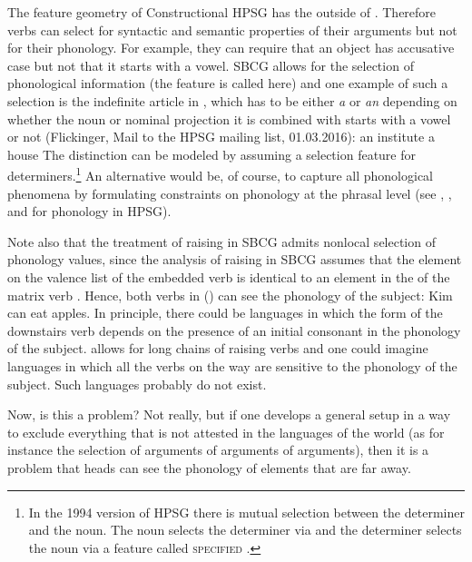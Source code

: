 \documentclass[output=paper,biblatex,babelshorthands,newtxmath,draftmode,colorlinks,citecolor=brown]{langscibook}
\begin{document}
The feature geometry of Constructional HPSG has the \phonv outside of \synsem. Therefore verbs can
select for syntactic and semantic properties of their arguments but not for their phonology. For
example, they can require that an object has accusative case but not that it starts with a
vowel. SBCG allows for the selection of phonological information (the feature is called \form here)
and one example of such a selection is the indefinite article in , which has to be either \emph{a} or
\emph{an} depending on whether the noun or nominal projection it is combined with starts with a
vowel or not (Flickinger, Mail to the HPSG mailing list, 01.03.2016):
\eal
\ex an institute
\ex a  house
\zl
The distinction can be modeled by assuming a selection feature for determiners.\footnote{%
  In the 1994 version of HPSG there is mutual selection between the determiner and the noun. The noun selects
  the determiner via \spr and the determiner selects the noun via a feature called
  \textsc{specified} \citep[--54]{ps2}.
} An alternative would be, of course, to capture all phonological phenomena by formulating constraints on phonology at the
phrasal level (see \citealp{BK94b}, \citealp{Hoehle99a-u}, and \citealp{Walther99a-u} for phonology in HPSG).

Note also that the treatment of raising in SBCG admits nonlocal selection of phonology
values, since the analysis of raising in SBCG assumes that the element on the valence list of the
embedded verb is identical to an element in the \argstl of the matrix verb \citep[]{Sag2012a}. Hence, both verbs in () can see the phonology of the subject:
\ea
Kim can eat apples.
\z
In principle, there could be languages in which the form of the downstairs verb depends on the
presence of an initial consonant in the phonology of the subject.  allows for long chains of
raising verbs and one could imagine languages in which all the verbs on the way are sensitive to the
phonology of the subject. Such languages probably do not exist.

Now, is this a problem? Not really, but if one develops a general setup in a
way to exclude everything that is not attested in the languages of the world (as for instance the
selection of arguments of arguments of arguments), then it is a problem that heads can see the
phonology of elements that are far away.
\end{document}
